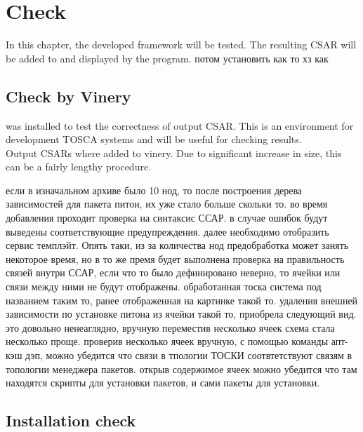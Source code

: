 
\chapter{Check}\label{chap:check}
In this chapter, the developed framework will be tested.
The resulting CSAR will be added to  and displayed by the program.
потом установить как то хз как
\fi
\section{Check by Vinery}
  was installed to test the correctness of output CSAR. 
 This is an environment for development TOSCA systems and will be useful for checking results. \\
 Output CSARs where added to vinery. 
 Due to significant increase in size, this can be a fairly lengthy procedure.

если в изначальном архиве было 10 нод, то после построения дерева зависимостей для пакета питон, их уже стало больше скольки то.
во время добавления проходит проверка на синтаксис ССАР. в случае ошибок будут выведены соответствующие предупреждения.
далее необходимо отобразить сервис темплэйт. Опять таки, из за количества нод предобработка может занять некоторое время, но в то же премя будет выполнена проверка на правильность связей внутри ССАР, если что то было дефинировано неверно, то ячейки или связи между ними не будут отображены.
обработанная тоска система под названием таким то, ранее отображенная на картинке такой то. удаления внешней зависимости по установке питона из ячейки такой то, приобрела следующий вид.
это довольно ненеаглядно, вручную переместив несколько ячеек схема стала несколько проще. проверив несколько ячеек вручную, с помощью команды апт-кэш дэп, можно убедится что связи в тпологии ТОСКИ соотвтетствуют связям в топологии менеджера пакетов.
открыв содержимое ячеек можно убедится что там находятся скрипты для установки пакетов, и сами пакеты для установки.
 
\fi
\section{Installation check}
\fi